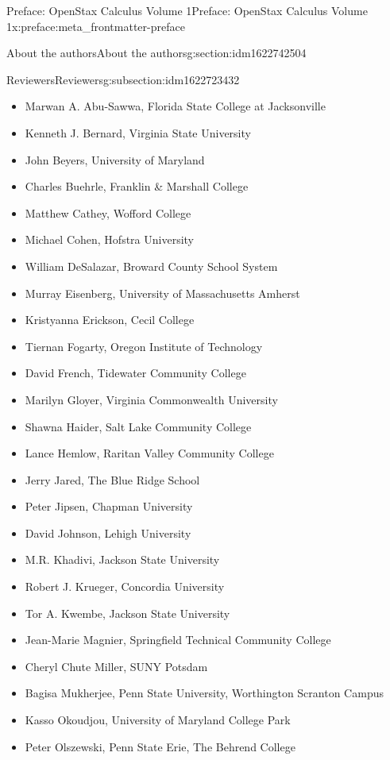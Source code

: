 \documentclass[oneside,10pt,]{book}
\numberwithin{equation}{section}
\begin{document}
\begin{preface}{Preface: OpenStax Calculus Volume 1}{}{Preface: OpenStax Calculus Volume 1}{}{}{x:preface:meta_frontmatter-preface}
\begin{sectionptx}{About the authors}{}{About the authors}{}{}{g:section:idm1622742504}
%
%
\typeout{************************************************}
\typeout{************************************************}
%
\begin{subsectionptx}{Reviewers}{}{Reviewers}{}{}{g:subsection:idm1622723432}
%
\begin{itemize}[label=\textbullet]
\item{}Marwan A. Abu-Sawwa, Florida State College at Jacksonville%
\item{}Kenneth J. Bernard, Virginia State University%
\item{}John Beyers, University of Maryland%
\item{}Charles Buehrle, Franklin \& Marshall College%
\item{}Matthew Cathey, Wofford College%
\item{}Michael Cohen, Hofstra University%
\item{}William DeSalazar, Broward County School System%
\item{}Murray Eisenberg, University of Massachusetts Amherst%
\item{}Kristyanna Erickson, Cecil College%
\item{}Tiernan Fogarty, Oregon Institute of Technology%
\item{}David French, Tidewater Community College%
\item{}Marilyn Gloyer, Virginia Commonwealth University%
\item{}Shawna Haider, Salt Lake Community College%
\item{}Lance Hemlow, Raritan Valley Community College%
\item{}Jerry Jared, The Blue Ridge School%
\item{}Peter Jipsen, Chapman University%
\item{}David Johnson, Lehigh University%
\item{}M.R. Khadivi, Jackson State University%
\item{}Robert J. Krueger, Concordia University%
\item{}Tor A. Kwembe, Jackson State University%
\item{}Jean-Marie Magnier, Springfield Technical Community College%
\item{}Cheryl Chute Miller, SUNY Potsdam%
\item{}Bagisa Mukherjee, Penn State University, Worthington Scranton Campus%
\item{}Kasso Okoudjou, University of Maryland College Park%
\item{}Peter Olszewski, Penn State Erie, The Behrend College%

\end{itemize}
\end{subsectionptx}
\end{sectionptx}
\end{preface}
\end{document}
